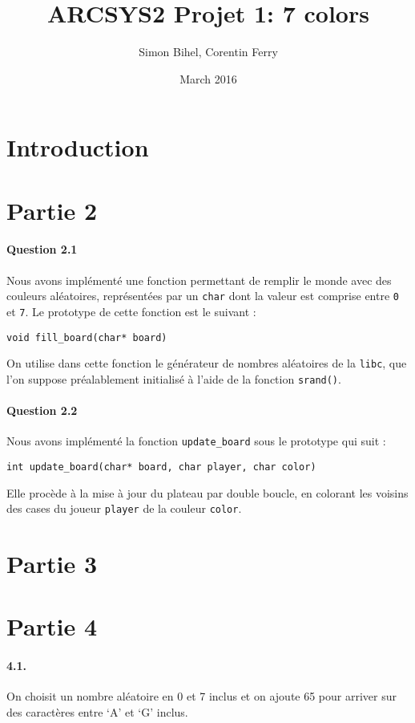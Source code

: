 \documentclass[a4paper]{article}
\title{ARCSYS2 Projet 1: 7 colors}
\author{Simon Bihel, Corentin Ferry}
\date{March 2016}
\begin{document}
    \maketitle

    \section{Introduction}

    \section{Partie 2}
    \paragraph{Question 2.1}
    Nous avons implémenté une fonction permettant de remplir le monde avec
des couleurs aléatoires, représentées par un \texttt{char} dont la valeur est
comprise entre \texttt{0} et \texttt{7}.
Le prototype de cette fonction est le suivant :
\begin{lstlisting}
void fill_board(char* board)
\end{lstlisting}
On utilise dans cette fonction le générateur de nombres aléatoires de la
\texttt{libc}, que l'on suppose préalablement initialisé à l'aide de la
fonction \texttt{srand()}.

    \paragraph{Question 2.2}

    Nous avons implémenté la fonction \texttt{update\_board} sous le prototype 
qui suit :
\begin{lstlisting}
int update_board(char* board, char player, char color)
\end{lstlisting}
Elle procède à la mise à jour du plateau par double boucle, en colorant les 
voisins des cases du joueur \texttt{player} de la couleur \texttt{color}.

    \section{Partie 3}

    \section{Partie 4}
    \paragraph{4.1.} On choisit un nombre aléatoire en 0 et 7 inclus et on
    ajoute 65 pour arriver sur des caractères entre `A' et `G' inclus.
\end{document}
